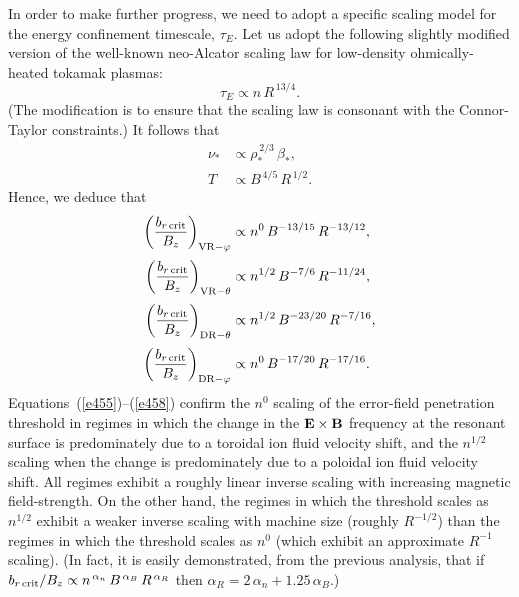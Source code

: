 \documentclass[12pt,prb,aps]{revtex4-1}
\begin{document}
In order to make further progress, we need to adopt a specific scaling model for the energy confinement timescale, $\tau_E$. Let us adopt
the following slightly modified version of the well-known neo-Alcator scaling law for low-density ohmically-heated tokamak plasmas:\cite{goldston,simmet,rf2012} 
\begin{equation}
\tau_E\propto n\,R^{\,13/4}.
\end{equation}
(The modification is to ensure that the scaling law is consonant with the Connor-Taylor constraints.\cite{connor})
It follows that
\begin{align}
\nu_\ast&\propto \rho_\ast^{\,2/3}\,\beta_\ast,\\[0.5ex]
T&\propto B^{\,4/5}\,R^{\,1/2}.
\end{align}
Hence, we deduce that 
\begin{align}\label{e455}
\left(\frac{b_{r\,{\rm crit}}}{B_z}\right)_{{\rm VR}-\varphi} &\propto n^{0}\,B^{-13/15}\,R^{-13/12},\\[0.5ex]
\left(\frac{b_{r\,{\rm crit}}}{B_z}\right)_{{\rm VR}-\theta} &\propto n^{1/2}\,B^{-7/6}\,R^{-11/24},\\[0.5ex]
\left(\frac{b_{r\,{\rm crit}}}{B_z}\right)_{{\rm DR}-\theta} &\propto n^{1/2}\,B^{-23/20}\,R^{-7/16},\\[0.5ex]
\left(\frac{b_{r\,{\rm crit}}}{B_z}\right)_{{\rm DR}-\varphi} &\propto n^{0}\,B^{-17/20}\,R^{-17/16}.\label{e458}
\end{align}
Equations~(\ref{e455})--(\ref{e458}) confirm the $n^{0}$ scaling of the error-field penetration threshold in regimes in which the change in the ${\bf E}\times{\bf B}$ frequency at the resonant surface is predominately due to a toroidal
ion fluid velocity shift, and the $n^{1/2}$ scaling when the change is predominately due to a poloidal ion fluid velocity shift. All regimes exhibit a roughly linear inverse scaling with increasing magnetic field-strength. On the other hand, the regimes in which the threshold scales as $n^{1/2}$ exhibit a
weaker inverse scaling with machine size (roughly $R^{-1/2}$) than the regimes in which the threshold scales as $n^0$ (which
exhibit an approximate $R^{-1}$ scaling). (In fact, it is easily demonstrated, from the previous analysis, that if 
$b_{r\,{\rm crit}}/B_z\propto n^{\,\alpha_n}\,B^{\,\alpha_B}\,R^{\,\alpha_R}$ then $\alpha_R = 2\,\alpha_n+1.25\,\alpha_B$.\cite{buttery})
\end{document}
